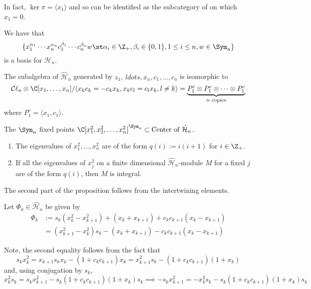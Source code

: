 \documentclass[11pt,leqno,oneside]{amsbook}
\renewcommand{\H}{\mathcal{H}}
\newcommand{\Cl}{\mathcal{C\ell}} %
\numberwithin{thm}{section}
\begin{document}
In fact, \(\ker \pi = \langle x_1 \rangle\) and so
\catname{\(\H_n\)-Mod} can be identified as the subcategory of
\catname{\(\hat{\H}_n\)-Mod} on which \(x_1 = 0\).
\begin{thm}
  We have that \[
    \{x_1^{\alpha_1} \cdots x_n^{\alpha_n} c_1^{\beta_1}\cdots
    c_n^{\beta_n}w \st \alpha_i \in \Z_+, \beta_i \in \{0,1\}, 1 \leq
    i \leq n, w \in \Sym_n\}
  \]
  is a basis for \(\hat{\H}_n\).
\end{thm}
\begin{cor}
  The subalgebra of \(\hat{\H}_n\) generated by \(z_1,\ ldots, x_n,
  c_1, \ldots, c_n\) is isomorphic to \[
    \Cl_n \otimes \C[x_1, \ldots, x_n] / \langle x_k c_k = -c_k x_k,
    x_k c_l = c_l x_k, l \neq k \rangle = \underbrace{P_1^c \otimes P_1^c \otimes
    \cdots \otimes P_1^c}_{n \text{ copies}}
\]
where \(P_1^c = \langle x_1,c_1 \rangle\). 
\end{cor}
\begin{prop}
  The \(\Sym_n\) fixed points \(\C[x_1^2,x_2^2,\ldots,x_n^2]^{\Sym_n}
  \subset \text{Center of }\hat{\H}_n\).
\end{prop}
\begin{prop}
  \begin{enumerate}
  \item The eigenvalues of \(x_1^2, \ldots, x_n^2\) are of the form
    \(q(i) := i(i+1)\) for \(i \in \Z_+\).
  \item If all the eigenvalues of \(x_j^2\) on a finite dimensional
    \(\hat{\H}_n\)-module \(M\) for a fixed \(j\) are of the form
    \(q(i)\), then \(M\) is integral.
  \end{enumerate}
\end{prop}
The second part of the proposition follows from the intertwining
elements.
\begin{defn}
  Let  \(\Phi_k \in \hat{\H}_n\) be given by
  \begin{align*}
    \Phi_k
    & := s_k(x_k^2-x_{k+1}^2) + (x_k + x_{k+1}) + c_k
      c_{k+1}(x_k-x_{k+1}) \\
    & = (x_{k+1}^2-x_k^2)s_k - (x_k + x_{k+1}) - c_k c_{k+1}(x_k-x_{k+1})
  \end{align*}
\end{defn}
Note, the second equality follows from the fact that \[
  s_k x_k^2 = x_{k+1} s_k x_k - (1+c_k c_{k+1}) x_k = x_{k+1}^2 s_k -
  (1+c_k c_{k+1})(1+x_k)
\]
and, using conjugation by \(s_k\), \[
  x_k^2 s_k = s_k x_{k+1}^2 - s_k (1+c_k c_{k+1})(1+x_k) s_k \implies
  - s_k x_{k+1}^2 = - x_k^2 s_k - s_k(1+c_k c_{k+1})(1+x_k) s_k
\]
\end{document}
